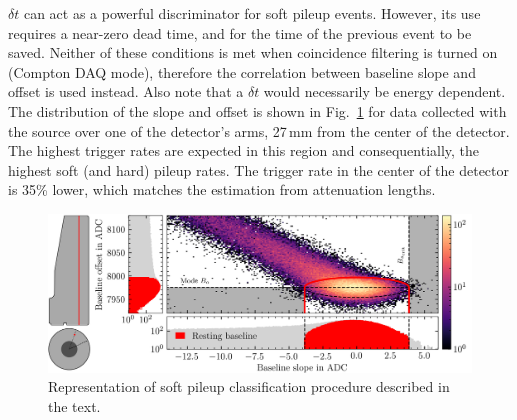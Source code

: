 $\delta t$ can act as a powerful discriminator for soft pileup events. However, its use requires a near-zero dead time, and for the time of the previous event to be saved. Neither of these conditions is met when coincidence filtering is turned on (Compton DAQ mode), therefore the correlation between baseline slope and offset is used instead. Also note that a $\delta t$ would necessarily be energy dependent. The distribution of the slope and offset is shown in Fig.~\ref{fig:soft_pileup} for data collected with the \CsS{} source over one of the detector's arms, 27\,mm from the center of the detector. The highest trigger rates are expected in this region and consequentially, the highest soft (and hard) pileup rates. The trigger rate in the center of the detector is 35\% lower, which matches the estimation from attenuation lengths.  
\begin{figure}[htb]
    \centering
    \includegraphics[width=6in]{figs/param/soft_pileup_maginalized_6_9in.png}
    \caption{Representation of soft pileup classification procedure described in the text.}
    \label{fig:soft_pileup}
\end{figure}

